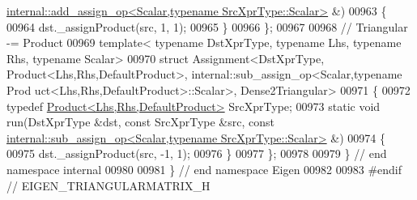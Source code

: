 \begin{DoxyCode}
      \hyperlink{struct_eigen_1_1internal_1_1add__assign__op}{internal::add\_assign\_op<Scalar,typename SrcXprType::Scalar>}
       &)
00963   \{
00964     dst.\_assignProduct(src, 1, 1);
00965   \}
00966 \};
00967 
00968 \textcolor{comment}{// Triangular -= Product}
00969 \textcolor{keyword}{template}< \textcolor{keyword}{typename} DstXprType, \textcolor{keyword}{typename} Lhs, \textcolor{keyword}{typename} Rhs, \textcolor{keyword}{typename} Scalar>
00970 \textcolor{keyword}{struct }Assignment<DstXprType, Product<Lhs,Rhs,DefaultProduct>, internal::sub\_assign\_op<Scalar,typename Prod
      uct<Lhs,Rhs,DefaultProduct>::Scalar>, Dense2Triangular>
00971 \{
00972   \textcolor{keyword}{typedef} \hyperlink{group___core___module_class_eigen_1_1_product}{Product<Lhs,Rhs,DefaultProduct>} SrcXprType;
00973   \textcolor{keyword}{static} \textcolor{keywordtype}{void} run(DstXprType &dst, \textcolor{keyword}{const} SrcXprType &src, \textcolor{keyword}{const} 
      \hyperlink{struct_eigen_1_1internal_1_1sub__assign__op}{internal::sub\_assign\_op<Scalar,typename SrcXprType::Scalar>}
       &)
00974   \{
00975     dst.\_assignProduct(src, -1, 1);
00976   \}
00977 \};
00978 
00979 \} \textcolor{comment}{// end namespace internal}
00980 
00981 \} \textcolor{comment}{// end namespace Eigen}
00982 
00983 \textcolor{preprocessor}{#endif // EIGEN\_TRIANGULARMATRIX\_H}
\end{DoxyCode}
